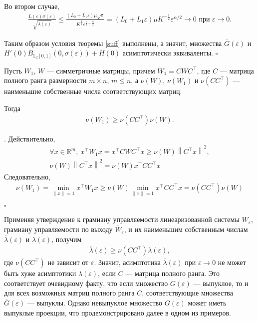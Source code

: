 \documentclass[../main.tex]{subfiles}
\begin{document}
 Во втором случае,
 \begin{gather*}
 \frac{L(\varepsilon) \sigma(\varepsilon)}{\sqrt{\overline{\lambda}(\varepsilon)}} 
 \leqslant
 \frac{(L_0+L_1\varepsilon)\mu\sqrt{\varepsilon}}{{K^{\frac{1}{2}}}\varepsilon^{\frac{1}{2}-\frac{\alpha}{2}}}
 =
 (L_0+L_1\varepsilon)\mu K^{-\frac{1}{2}}\varepsilon^{\alpha/2} \rightarrow 0 \mbox{\ при\ } \varepsilon \rightarrow 0.
 \end{gather*}
 
 Таким образом условия теоремы \ref{suff} выполнены, а значит, множества $ \overline{G}(\varepsilon) $ и \\$ H'(0)B_{\mathbb{L}_2[0,1]}(0,\sigma(\varepsilon))+ H(0) $ асимптотически эквиваленты.
 \hfill $\square$
 \begin{utv}
 Пусть $ W_1 $, $ W $ --- симметричные матрицы, причем $ W_1 = C W C^{\top} $, где $ C $ --- матрица полного ранга размерности $ m \times n $, $ m \leqslant n $, а $ \nu(W) $, $ \nu(W_1) $ и $ \nu(CC^{\top}) $ --- наименьшие собственные числа соответствующих матриц.
 
 Тогда
 \begin{gather*}
 \nu(W_1) \geqslant \nu(CC^{\top}) \nu(W).
 \end{gather*}
 \end{utv}
 \doc. 
 Действительно,
 \begin{gather*}
 \forall x \in \mathbb{R}^m, \: x^{\top} W_1 x = x^{\top} C W C^{\top} x \geqslant \nu(W)\left\| C^{\top}x \right\| ^2,\\
 \nu(W)\left\| C^{\top}x \right\| ^2 = \nu(W) x^{\top} C C^{\top} x
 \end{gather*}
 Следовательно,
 \begin{gather*}
 \nu(W_1) = \min \limits_{\left\| x\right\| =1}x^{\top}W_1x \geqslant \nu(W)\min \limits_{\left\| x\right\| =1}x^{\top}CC^{\top}x = \nu(CC^{\top}) \nu(W) 
 \end{gather*} \begin{flushright}
 \hfill $ \square $
 \end{flushright}
 
 Применяя утверждение к грамиану управляемости линеаризованной системы $ W_{\varepsilon} $, грамиану управляемости по выходу $ \overline{W}_{\varepsilon}$, и их наименьшим собственным числам $ \overline{\lambda}(\varepsilon) $ и $ \lambda(\varepsilon) $, получим
 \begin{gather*}
 \overline{\lambda}(\varepsilon) \geqslant \nu(CC^{\top}) \lambda(\varepsilon),
 \end{gather*}
 где $ \nu(CC^{\top}) $ не зависит от $ \varepsilon $. 
 Значит, асимптотика $ \overline{\lambda}(\varepsilon) $ при $\varepsilon \rightarrow 0$ не может быть хуже асимптотики $ \lambda(\varepsilon) $, если $ C $ --- матрица полного ранга. 
 Это соответствует очевидному факту, что если множество $ G(\varepsilon) $ --- выпуклое, то и для всех возможных матриц полного ранга $ C $, соответствующие множества $ \overline{G}(\varepsilon) $ --- выпуклы. 
 Однако невыпуклое множество $ G(\varepsilon) $ может иметь выпуклые проекции, что продемонстрировано далее в одном из примеров.
 
\end{document}
